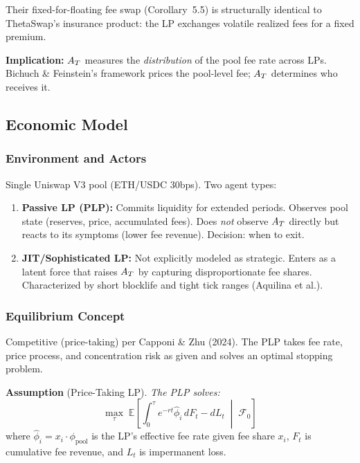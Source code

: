 Their fixed-for-floating fee swap (Corollary~5.5) is structurally identical to
ThetaSwap's insurance product: the LP exchanges volatile realized fees for a
fixed premium.

\textbf{Implication:} $A_T$ measures the \emph{distribution} of the pool fee
rate across LPs. Bichuch \& Feinstein's framework prices the pool-level fee;
$A_T$ determines who receives it.


\subsection{Economic Model}\label{subsec:econ-model}

\subsubsection{Environment and Actors}

Single Uniswap V3 pool (ETH/USDC 30bps). Two agent types:

\begin{enumerate}
  \item \textbf{Passive LP (PLP):} Commits liquidity for extended periods.
    Observes pool state (reserves, price, accumulated fees). Does \emph{not}
    observe $A_T$ directly but reacts to its symptoms (lower fee revenue).
    Decision: when to exit.

  \item \textbf{JIT/Sophisticated LP:} Not explicitly modeled as strategic.
    Enters as a latent force that raises $A_T$ by capturing disproportionate
    fee shares. Characterized by short blocklife and tight tick ranges
    (Aquilina et al.).
\end{enumerate}

\subsubsection{Equilibrium Concept}

Competitive (price-taking) per Capponi \& Zhu (2024). The PLP takes fee rate,
price process, and concentration risk as given and solves an optimal stopping
problem.

\textbf{Assumption} (Price-Taking LP). \emph{The PLP solves:}
\begin{equation}\label{eq:plp-stopping}
  \max_{\tau}\; \mathbb{E}\!\left[
    \int_0^{\tau} e^{-rt} \hat{\phi}_i \, dF_t - dL_t
    \;\middle|\; \mathcal{F}_0
  \right]
\end{equation}
where $\hat{\phi}_i = x_i \cdot \phi_{\text{pool}}$ is the LP's effective fee
rate given fee share $x_i$, $F_t$ is cumulative fee revenue, and $L_t$ is
impermanent loss.

